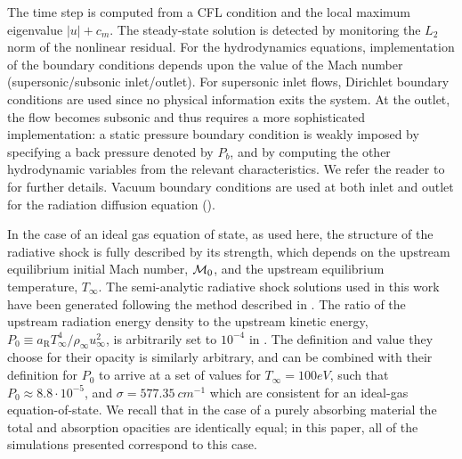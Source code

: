 \documentclass[times,doublespace]{fldauth}%
\begin{document}
The time step is computed from a CFL condition and the local maximum eigenvalue $|u|+c_m$.
The steady-state solution is detected by monitoring the $L_2$ norm of the nonlinear residual. 
For the hydrodynamics equations, implementation of the boundary conditions depends upon the value of the Mach number (supersonic/subsonic inlet/outlet).
For supersonic inlet flows, Dirichlet boundary conditions are used since no physical information exits the system.
At the outlet, the flow becomes subsonic and thus requires a more sophisticated implementation: a static pressure boundary condition is weakly imposed by specifying a back pressure denoted by $P_b$, and by computing the other hydrodynamic variables from the relevant characteristics. We refer the reader to  for further details.
Vacuum boundary conditions are used at both inlet and outlet for the radiation diffusion equation ().

In the case of an ideal gas equation of state, as used here, the structure of the radiative shock is fully described by its strength, which depends on the upstream equilibrium initial Mach number, ${\cal M}_0$, and the upstream equilibrium temperature, $T_{\infty}$.
The semi-analytic radiative shock solutions used in this work have been generated following the method described in \cite{LowrieEdwards}.
The ratio of the upstream radiation energy density to the upstream kinetic energy, $P_0 \equiv a_{\textrm{R}} T_{\infty}^4 / \rho_{\infty} u_{\infty}^2$, is arbitrarily set to $10^{-4}$ in \cite{LowrieEdwards}.
The definition and value they choose for their opacity is similarly arbitrary, and can be combined with their definition for $P_0$ to arrive at a set of values for $T_{\infty} = 100 eV$, such that $P_0 \approx 8.8\cdot 10^{-5}$, and $\sigma = 577.35 \ cm^{-1}$ which are consistent for an ideal-gas equation-of-state.  We recall that in the case of a purely absorbing material the total and absorption opacities are identically equal; in this paper, all of the simulations presented correspond to this case. 
\end{document}
